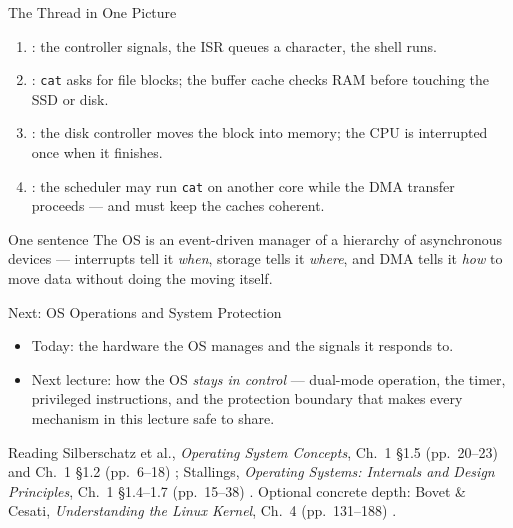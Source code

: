 \documentclass[aspectratio=169]{beamer}
\begin{document}
\begin{frame}{The Thread in One Picture}
  \begin{enumerate}
    \item {}: the controller signals, the ISR queues a
      character, the shell runs.
    \item {}: \texttt{cat} asks for file blocks; the
      buffer cache checks RAM before touching the SSD or disk.
    \item {}: the disk controller moves the block into memory; the CPU is
      interrupted once when it finishes.
    \item {}: the scheduler may run \texttt{cat} on another core
      while the DMA transfer proceeds --- and must keep the caches coherent.
  \end{enumerate}
  \vspace{0.2cm}
  \begin{block}{One sentence}
    The OS is an event-driven manager of a hierarchy of asynchronous devices ---
    interrupts tell it \emph{when}, storage tells it \emph{where}, and DMA tells
    it \emph{how} to move data without doing the moving itself.
  \end{block}
\end{frame}

\begin{frame}{Next: OS Operations and System Protection}
  \begin{itemize}
    \item Today: the hardware the OS manages and the signals it responds to.
    \item Next lecture: how the OS \emph{stays in control} --- dual-mode
      operation, the timer, privileged instructions, and the protection
      boundary that makes every mechanism in this lecture safe to share.
  \end{itemize}
  \vspace{0.3cm}
  \begin{block}{Reading}
    Silberschatz et al., \emph{Operating System Concepts}, Ch.~1 \S1.5
    (pp.~20--23) and Ch.~1 \S1.2 (pp.~6--18)
    \cite{SilberschatzOSC_operating_system_concepts}; Stallings,
    \emph{Operating Systems: Internals and Design Principles}, Ch.~1
    \S1.4--1.7 (pp.~15--38) \cite{StallingsOS_internals_design_principles}.
    Optional concrete depth: Bovet \& Cesati, \emph{Understanding the Linux
    Kernel}, Ch.~4 (pp.~131--188)
    \cite{BovetCesati_understanding_linux_kernel}.
  \end{block}
\end{frame}
\end{document}
